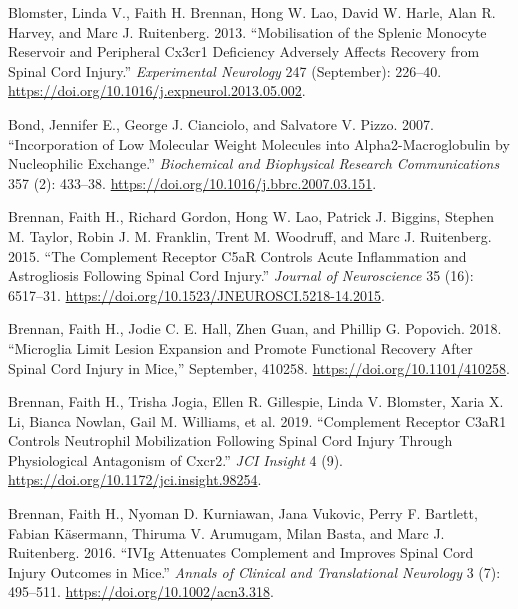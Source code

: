 \documentclass[9pt,lineno]{elife}
\newlength{\cslhangindent}
\newlength{\cslentryspacingunit} %
\newenvironment{CSLReferences}[2] %
 {%
  \setlength{\parindent}{0pt}
  \ifodd #1
  \let\oldpar\par
  \def\par{\hangindent=\cslhangindent\oldpar}
  \fi
  \setlength{\parskip}{#2\cslentryspacingunit}
 }%
 {}
\begin{document}
\begin{CSLReferences}{1}{0}
\leavevmode{}%
Blomster, Linda V., Faith H. Brennan, Hong W. Lao, David W. Harle, Alan R. Harvey, and Marc J. Ruitenberg. 2013. {``Mobilisation of the Splenic Monocyte Reservoir and Peripheral {Cx3cr1} Deficiency Adversely Affects Recovery from Spinal Cord Injury.''} \emph{Experimental Neurology} 247 (September): 226--40. \url{https://doi.org/10.1016/j.expneurol.2013.05.002}.

\leavevmode{}%
Bond, Jennifer E., George J. Cianciolo, and Salvatore V. Pizzo. 2007. {``Incorporation of Low Molecular Weight Molecules into Alpha2-{Macroglobulin} by Nucleophilic Exchange.''} \emph{Biochemical and Biophysical Research Communications} 357 (2): 433--38. \url{https://doi.org/10.1016/j.bbrc.2007.03.151}.

\leavevmode{}%
Brennan, Faith H., Richard Gordon, Hong W. Lao, Patrick J. Biggins, Stephen M. Taylor, Robin J. M. Franklin, Trent M. Woodruff, and Marc J. Ruitenberg. 2015. {``The {Complement Receptor C5aR Controls Acute Inflammation} and {Astrogliosis} Following {Spinal Cord Injury}.''} \emph{Journal of Neuroscience} 35 (16): 6517--31. \url{https://doi.org/10.1523/JNEUROSCI.5218-14.2015}.

\leavevmode{}%
Brennan, Faith H., Jodie C. E. Hall, Zhen Guan, and Phillip G. Popovich. 2018. {``Microglia Limit Lesion Expansion and Promote Functional Recovery After Spinal Cord Injury in Mice,''} September, 410258. \url{https://doi.org/10.1101/410258}.

\leavevmode{}%
Brennan, Faith H., Trisha Jogia, Ellen R. Gillespie, Linda V. Blomster, Xaria X. Li, Bianca Nowlan, Gail M. Williams, et al. 2019. {``Complement Receptor {C3aR1} Controls Neutrophil Mobilization Following Spinal Cord Injury Through Physiological Antagonism of {Cxcr2}.''} \emph{JCI Insight} 4 (9). \url{https://doi.org/10.1172/jci.insight.98254}.

\leavevmode{}%
Brennan, Faith H., Nyoman D. Kurniawan, Jana Vukovic, Perry F. Bartlett, Fabian Käsermann, Thiruma V. Arumugam, Milan Basta, and Marc J. Ruitenberg. 2016. {``{IVIg} Attenuates Complement and Improves Spinal Cord Injury Outcomes in Mice.''} \emph{Annals of Clinical and Translational Neurology} 3 (7): 495--511. \url{https://doi.org/10.1002/acn3.318}.


\end{CSLReferences}
\end{document}
